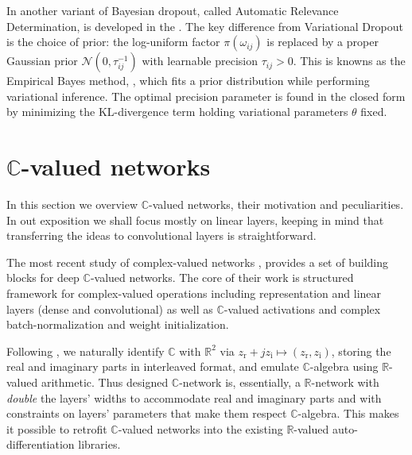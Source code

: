 \documentclass[a4paper,10pt]{article}
\newcommand{\real}{\mathbb{R}}
\newcommand{\cplx}{\mathbb{C}}
\begin{document}
In another variant of Bayesian dropout, called Automatic Relevance Determination, is developed
in the \cite{molchanov2018}. The key difference from Variational Dropout is the choice of
prior: the log-uniform factor $\pi(\omega_{ij})$ is replaced by a proper Gaussian prior
$\mathcal{N}(0, \tau^{-1}_{ij})$ with learnable precision $\tau_{ij} > 0$. This is knowns as
the Empirical Bayes method, \cite{citation_needed}, which fits a prior distribution while
performing variational inference. The optimal precision parameter is found in the closed form
by minimizing the KL-divergence term holding variational parameters $\theta$ fixed.





\section{$\cplx$-valued networks} %
\label{sec:c_valued_networks}

In this section we overview $\mathbb{C}$-valued networks, their motivation and peculiarities.
In out exposition we shall focus mostly on linear layers, keeping in mind that transferring 
the ideas to convolutional layers is straightforward.

The most recent study of complex-valued networks \cite{trabelsi_deep_2017}, provides a set
of building blocks for deep $\cplx$-valued networks. The core of their work is structured
framework for complex-valued operations including representation and linear layers (dense
and convolutional) as well as $\cplx$-valued activations and complex batch-normalization
and weight initialization.

Following \cite{trabelsi_deep_2017}, we naturally identify $\cplx$ with $\real^2$ via $
  z_\mathrm{r} + j z_\mathrm{i} \mapsto (z_\mathrm{r}, z_\mathrm{i})
$, storing the real and imaginary parts in interleaved format, and emulate $\cplx$-algebra
using $\real$-valued arithmetic. Thus designed $\cplx$-network is, essentially, a
$\real$-network with \textit{double} the layers' widths to accommodate real and imaginary
parts and with constraints on layers' parameters that make them respect $\cplx$-algebra.
This makes it possible to retrofit $\cplx$-valued networks into the existing $\real$-valued
auto-differentiation libraries.
\end{document}
